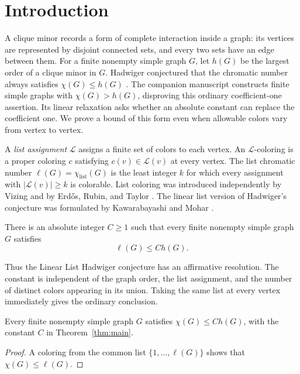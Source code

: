 \begin{abstract}
We prove that every finite nonempty graph $G$ satisfies
$\chi_{\mathrm{list}}(G)\le C h(G)$ for an absolute integer $C$, where
$h(G)$ is the largest order of a clique minor. This resolves the Linear
List Hadwiger conjecture affirmatively.
\end{abstract}
\section{Introduction}\label{sec:introduction}

A clique minor records a form of complete interaction inside a graph:
its vertices are represented by disjoint connected sets, and every two
sets have an edge between them. For a finite nonempty simple graph $G$,
let $h(G)$ be the largest order of a clique minor in $G$. Hadwiger
conjectured that the chromatic number always satisfies
$\chi(G)\le h(G)$ \cite{Hadwiger1943}. The companion manuscript
\cite[Corollary~1.2]{OpenAIHadwigerCounterexample2026} constructs finite
simple graphs with $\chi(G)>h(G)$, disproving this ordinary coefficient-one
assertion. Its linear relaxation asks whether
an absolute constant can replace the coefficient one. We prove a bound
of this form even when allowable colors vary from vertex to vertex.

A \emph{list assignment} $\mathcal L$ assigns a finite set of colors to
each vertex. An $\mathcal L$-coloring is a proper coloring $c$ satisfying
$c(v)\in\mathcal L(v)$ at every vertex. The list chromatic number
$\ell(G)=\chi_{\mathrm{list}}(G)$ is the least integer $k$ for which every
assignment with $|\mathcal L(v)|\ge k$ is colorable. List coloring was
introduced independently by Vizing \cite{Vizing1976} and by Erd\H{o}s,
Rubin, and Taylor \cite{ErdosRubinTaylor1980}. The linear list
version of Hadwiger's conjecture was formulated by Kawarabayashi and
Mohar \cite[Conjecture~1.3]{KawarabayashiMohar2007}.

\begin{theorem}\label{thm:main}
There is an absolute integer $C\ge1$ such that every finite nonempty
simple graph $G$ satisfies
\[
 \ell(G)\le C h(G).
\]
\end{theorem}

Thus the Linear List Hadwiger conjecture has an affirmative resolution.
The constant is independent of the graph order, the list assignment, and
the number of distinct colors appearing in its union. Taking the same
list at every vertex immediately gives the ordinary conclusion.

\begin{corollary}\label{cor:ordinary}
Every finite nonempty simple graph $G$ satisfies $\chi(G)\le C h(G)$,
with the constant $C$ in Theorem~\ref{thm:main}.
\end{corollary}
\begin{proof}
A coloring from the common list $\{1,\ldots,\ell(G)\}$ shows that
$\chi(G)\le\ell(G)$.
\end{proof}
